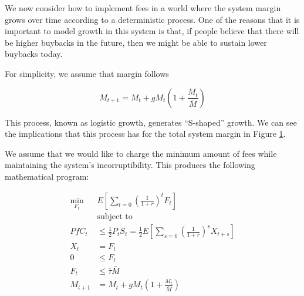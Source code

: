 
We now consider how to implement fees in a world where the system margin grows over time
according to a deterministic process. One of the reasons that it is important to model growth in
this system is that, if people believe that there will be higher buybacks in the future, then we
might be able to sustain lower buybacks today.

For simplicity, we assume that margin follows

$$M_{t+1} = M_{t} + g M_{t} \left(1 + \frac{M_{t}}{\bar{M}} \right)$$

This process, known as logistic growth, generates ``S-shaped'' growth. We can see the implications
that this process has for the total system margin in Figure \ref{fig:dg_margin_growth}.

\begin{center}
  \begin{figure}[H]
    \label{fig:dg_margin_growth}
  \end{figure}
\end{center}

We assume that we would like to charge the minimum amount of fees while maintaining the system's
incorruptibility. This produces the following mathematical program:

\begin{align*}
  \min_{F_t} \; &E \left[ \sum_{t=0} \left(\frac{1}{1 + r} \right)^t F_t \right] \\
  &\text{subject to} \\
  PfC_t &\leq \frac{1}{2} P_t S_t = \frac{1}{2} E \left[ \sum_{s=0} \left(\frac{1}{1 + r}\right)^s  X_{t + s} \right] \\
  X_{t} &= F_t \\
  0 &\leq F_t \\
  F_t &\leq \bar{\tau} \bar{M} \\
  M_{t+1} &= M_{t} + g M_{t} \left(1 + \frac{M_t}{\bar{M}} \right)
\end{align*}

